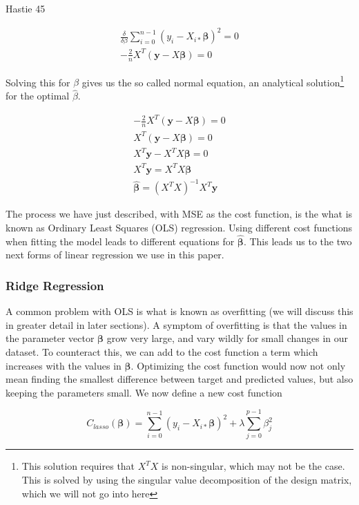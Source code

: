 \documentclass[twocolumn,10pt,cleanfoot]{asme2ej}
\begin{document}
Hastie 45

\begin{gather}
\frac{\delta}{\delta \beta} \sum_{i=0}^{n-1}(y_i-X_{i*}\bm{\beta})^2 = 0 \\
 - \frac{2}{n} X^T(\bm{y} - X\bm{\beta}) = 0
\end{gather}

Solving this for $\beta$ gives us the so called normal equation, an analytical solution\footnote{This solution requires that $X^TX$ is non-singular, which may not be the case. This is solved by using the singular value decomposition of the design matrix, which we will not go into here} for the optimal $\hat{\beta}$.

\begin{gather}
- \frac{2}{n} X^T(\bm{y} - X\bm{\beta}) = 0 \\
X^T(\bm{y} - X\bm{\beta}) = 0 \\
X^T\bm{y} - X^TX\bm{\beta} = 0 \\
X^T\bm{y} = X^TX\bm{\beta} \\
\bm{\hat{\beta}} = (X^TX)^{-1}X^T\bm{y}
\end{gather}

The process we have just described, with MSE as the cost function, is the what is known as Ordinary Least Squares (OLS) regression. Using different cost functions when fitting the model leads to different equations for $\bm{\hat{\beta}}$. This leads us to the two next forms of linear regression we use in this paper.

\subsubsection{Ridge Regression}

	A common problem with OLS is what is known as overfitting (we will discuss this in greater detail in later sections). A symptom of overfitting is that the values in the parameter vector $\bm{\beta}$ grow very large, and vary wildly for small changes in our dataset. To counteract this, we can add to the cost function a term which increases with the values in $\bm{\beta}$. Optimizing the cost function would now not only mean finding the smallest difference between target and predicted values, but also keeping the parameters small. We now define a new cost function

\begin{equation}
	C_{lasso}(\bm{\beta}) = \sum_{i=0}^{n-1}(y_i-X_{i*}\bm{\beta})^2 + \lambda \sum_{j=0}^{p-1} \beta_j^2
\end{equation}
\end{document}

